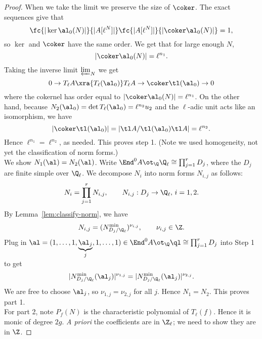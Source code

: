 \begin{proof}
When we take the limit we preserve the size of $\coker$. 
The exact sequences give that 
\[
\fc{|\ker\al_0(N)|}{|A[\ell^N]|}\fc{|A[\ell^N]|}{|\coker \al_0(N)|}=1,
\]
so $\ker$ and $\coker$ have the same order. 
We get that for large enough $N$,
\[
|\coker \al_0(N)|=\ell^{n_1}.
\]
Taking the inverse limit $\varprojlim_{N}$ we get
\[
0\to T_{\ell}A\xra{T_{\ell}(\al_0)} T_{\ell} A\to \coker \tl(\al_0)\to 0
\]
where the cokernel has order equal to $|\coker \al_0(N)|=\ell^{n_1}$. 
On the other hand, %
because $N_2(\al_0)=\det T_{\ell}(\al_0)=\ell^{n_2}u_2$ and the $\ell$-adic unit acts like an isomorphism, we have
\[
|\coker \tl(\al_0)|=|\tl A/\tl (\al_0)\tl A|=\ell^{n_2}.
\]
Hence $\ell^{n_1}=\ell^{n_2}$, as needed.
This proves step 1. (Note we used homogeneity, not yet the classification of norm forms.)\\

 We show $N_1(\al)=N_2(\al)$. Write $ \End^0A\ot_{\Q}\Q_{\ell}\cong \prod_{j=1}^r D_j$, where the $D_j$ are
 finite simple over $\Q_{\ell}$. %
We decompose $N_i$ into norm forms $N_{i,j}$ as follows:
\[
N_i=\prod_{j=1}^r N_{i,j},\qquad N_{i,j}:D_j\to \Q_{\ell},\,i=1,2.
\]
By Lemma~\ref{lem:classify-norm}, we have
\[
N_{i,j}=(N_{D_j/\Q_{\ell}}^{\min})^{\nu_{i,j}},\qquad \nu_{i,j}\in \Z.
\]
Plug in $\al=(1,\ldots, 1, \underbrace{\al_j}_j,1,\ldots, 1)\in \End^0A\ot_{\Q}\ql\cong \prod_{j=1}^r D_j$ into Step 1 to get
\[
|N_{D_j/\Q_{\ell}}^{\min}(\al_j)|^{\nu_{1,j}}=
|N_{D_j/\Q_{\ell}}^{\min}(\al_j)|^{\nu_{2,j}}.
\]
We are free to choose $\al_j$, so $\nu_{1,j}=\nu_{2,j}$ for all $j$. Hence $N_1=N_2$.  This proves part 1. \\

For part 2, note $P_f(N)$ is the characteristic polynomial of $T_{\ell}(f)$. Hence it is monic of degree $2g$. {\it A priori} the coefficients are in $\Z_{\ell}$; we need to show they are in $\Z$.


\end{proof}
